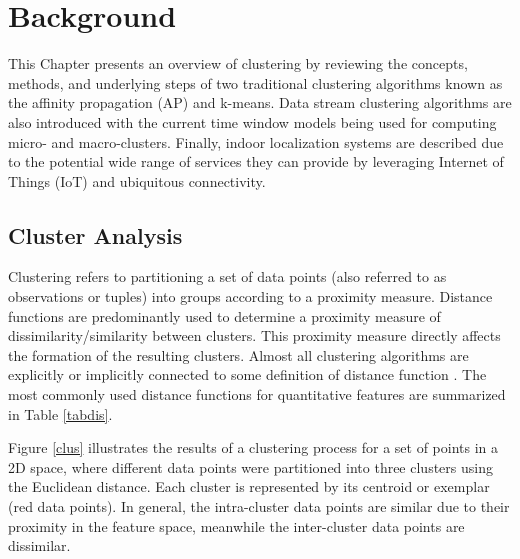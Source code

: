 \documentclass[../UNBThesis2.tex]{subfiles}
\begin{document}
\chapter{Background}


This Chapter presents an overview of clustering by reviewing the concepts, methods, and underlying steps of two traditional clustering algorithms known as the affinity propagation (AP) and k-means. Data stream clustering algorithms are also introduced with the current time window models being used for computing micro- and macro-clusters. Finally, indoor localization systems are described due to the potential wide range of services they can provide by leveraging Internet of Things (IoT) and ubiquitous connectivity. 




\section{Cluster Analysis}

Clustering refers to partitioning a set of data points (also referred to as observations or tuples) into groups according to a proximity measure. Distance functions are predominantly used to determine a proximity measure of dissimilarity/similarity between clusters.  This proximity measure directly affects the formation of the resulting clusters. Almost all clustering algorithms are explicitly or implicitly connected to some definition of distance function \cite{zumel2014practical}. The most commonly used distance functions for quantitative features are summarized in Table \ref{tabdis}. 

Figure \ref{clus} illustrates the results of a clustering process for a set of points in a 2D space, where different data points were partitioned into three clusters using the Euclidean distance. Each cluster is represented by its centroid or exemplar (red data points). In general, the intra-cluster data points are similar due to their proximity in the feature space, meanwhile the inter-cluster data points are dissimilar. 
\end{document}
